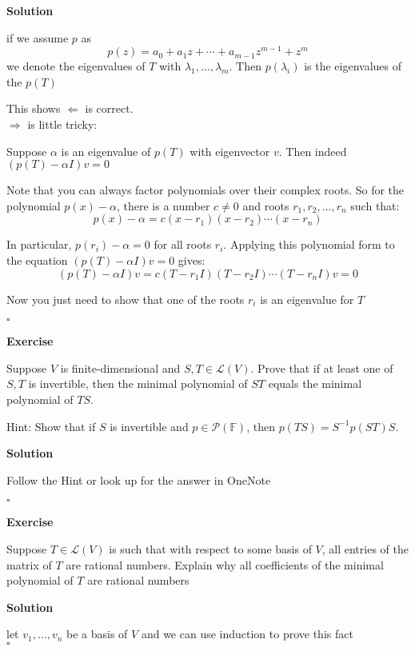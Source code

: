 \documentclass{article}
\newenvironment{exercise}{%
{\textbf{Exercise\\}
    }
}{
}
\newenvironment{solution}{%
{
    \textbf{Solution\\}
    }
}{
  \hfill $\square$ 
  \par\bigskip 
}
\newcommand{\FF}{\mathbb{F}}
\begin{document}
\begin{CJK}{UTF8}{gkai}
\begin{solution}
    if we assume $p$ as
    \[p(z) = a_0 + a_1 z + \cdots +a_{m - 1} z^{m - 1}  + z^m\]
    we denote the eigenvalues of $T$ with $\lambda_1,\ldots,\lambda_m$. Then $p(\lambda_i)$ is the eigenvalues of the $p(T)$

    This shows $\Leftarrow$ is correct.\\

    $\Rightarrow$ is little tricky:

    Suppose $\alpha$ is an eigenvalue of $p(T)$ with eigenvector $v$. Then indeed $(p(T)-\alpha I)v = 0$

    Note that you can always factor polynomials over their complex roots. So for the polynomial $p(x) - \alpha$, there is a number $c \neq 0$ and roots $r_1,r_2,\ldots,r_n$ such that:
    \[p(x)-\alpha=c(x-r_1)(x-r_2)\cdots(x-r_n)\]

    In particular, $p(r_i)-\alpha=0$ for all roots $r_i$. Applying this polynomial form to the equation $(p(T)-\alpha I)v=0$ gives:
    \[(p(T) - \alpha I) v = c(T- r_1 I )(T - r_2 I)\cdots(T - r_n I) v = 0\]

    Now you just need to show that one of the roots $r_i$ is an eigenvalue for $T$

\end{solution}

\begin{exercise}
    Suppose $V$ is finite-dimensional and $S,T \in \mathcal{L}(V)$. Prove that if at least one of $S,T$ is invertible, then the minimal polynomial of $ST$ equals the minimal polynomial of $TS$.

    Hint: Show that if $S$ is invertible and $p \in \mathcal{P}(\FF)$, then $p(TS) = S^{-1}p(ST)S$.
    
\end{exercise}

\begin{solution}
    Follow the Hint or look up for the answer in OneNote
\end{solution}


\begin{exercise}
    Suppose $T \in \mathcal{L}(V)$ is such that with respect to some basis of $V$, all entries of the matrix of $T$ are rational numbers. Explain why all coefficients of the minimal polynomial of $T$ are rational numbers
\end{exercise}

\begin{solution}
    let $v_1,\ldots,v_n$ be a basis of $V$ and we can use induction to prove this fact\\


\end{solution}
\end{CJK}
\end{document}
